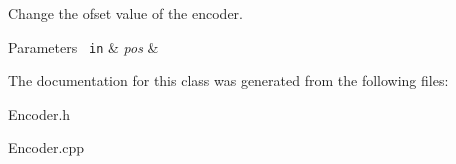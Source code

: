 Change the ofset value of the encoder. 


\begin{DoxyParams}[1]{Parameters}
\mbox{\texttt{ in}}  & {\em pos} & \\
\hline
\end{DoxyParams}


The documentation for this class was generated from the following files\+:\begin{DoxyCompactItemize}
\item 
Encoder.\+h\item 
Encoder.\+cpp\end{DoxyCompactItemize}

